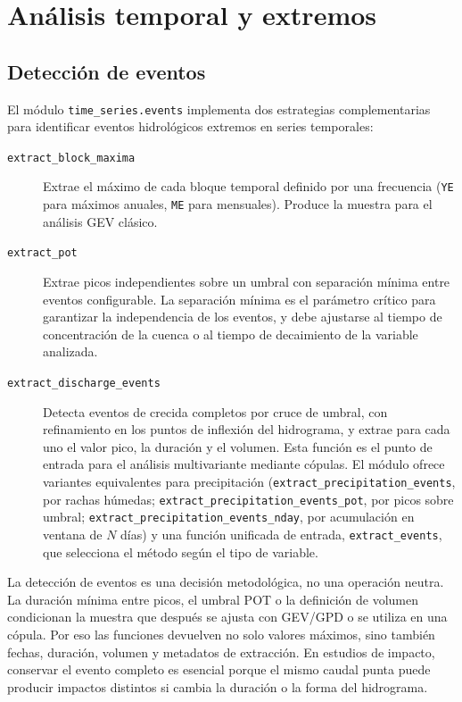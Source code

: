 \section{Análisis temporal y extremos}

\subsection{Detección de eventos}

El módulo \texttt{time\_series.events} implementa dos estrategias complementarias para identificar eventos hidrológicos extremos en series temporales:

\begin{description}
  \item[\texttt{extract\_block\_maxima}] Extrae el máximo de cada bloque temporal definido por una frecuencia (\texttt{YE} para máximos anuales, \texttt{ME} para mensuales). Produce la muestra para el análisis GEV clásico.

  \item[\texttt{extract\_pot}] Extrae picos independientes sobre un umbral con separación mínima entre eventos configurable. La separación mínima es el parámetro crítico para garantizar la independencia de los eventos, y debe ajustarse al tiempo de concentración de la cuenca o al tiempo de decaimiento de la variable analizada.

  \item[\texttt{extract\_discharge\_events}] Detecta eventos de crecida completos por cruce de umbral, con refinamiento en los puntos de inflexión del hidrograma, y extrae para cada uno el valor pico, la duración y el volumen. Esta función es el punto de entrada para el análisis multivariante mediante cópulas. El módulo ofrece variantes equivalentes para precipitación (\texttt{extract\_precipitation\_events}, por rachas húmedas; \texttt{extract\_precipitation\_events\_pot}, por picos sobre umbral; \texttt{extract\_precipitation\_events\_nday}, por acumulación en ventana de $N$ días) y una función unificada de entrada, \texttt{extract\_events}, que selecciona el método según el tipo de variable.
\end{description}

La detección de eventos es una decisión metodológica, no una operación neutra. La duración mínima entre picos, el umbral POT o la definición de volumen condicionan la muestra que después se ajusta con GEV/GPD o se utiliza en una cópula. Por eso las funciones devuelven no solo valores máximos, sino también fechas, duración, volumen y metadatos de extracción. En estudios de impacto, conservar el evento completo es esencial porque el mismo caudal punta puede producir impactos distintos si cambia la duración o la forma del hidrograma.

